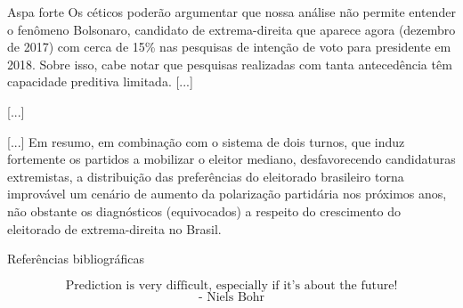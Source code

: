\documentclass[9pt]{beamer}
\begin{document}
\begin{frame}{Aspa forte}
    Os céticos poderão argumentar que nossa análise não permite entender o fenômeno Bolsonaro, candidato de extrema-direita que aparece agora (dezembro de 2017) com cerca de 15\% nas pesquisas de intenção de voto para presidente em 2018. Sobre isso, cabe notar que pesquisas realizadas com tanta antecedência têm capacidade preditiva limitada. [...]

    [...]

    [...] Em resumo, em combinação com o sistema de dois turnos, que induz fortemente os partidos a mobilizar o eleitor mediano, desfavorecendo candidaturas extremistas, a distribuição das preferências do eleitorado brasileiro torna improvável um cenário de aumento da polarização partidária nos próximos anos, não obstante os diagnósticos (equivocados) a respeito do crescimento do eleitorado de extrema-direita no Brasil. \cite[p. ~80]{borges}
\end{frame}

\begin{frame}{Referências bibliográficas}

\nocite{}
\end{frame}

\begin{frame}{}
$$\text{Prediction is very difficult, especially if it's about the future!}$$
$$\text{- Niels Bohr}$$
\end{frame}
\end{document}
